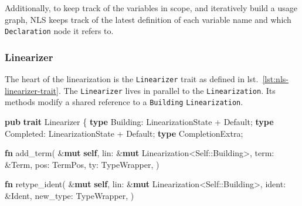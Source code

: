 \documentclass[
  a4paper,
  bibtex,
  english,
  nomenclature]{kthlatex/kththesis/kththesis}
\newenvironment{Shaded}{}{}
\newcommand{\DataTypeTok}[1]{\textcolor[rgb]{0.56,0.13,0.00}{#1}}
\newcommand{\KeywordTok}[1]{\textcolor[rgb]{0.00,0.44,0.13}{\textbf{#1}}}
\newcommand{\NormalTok}[1]{#1}
\newcommand{\OperatorTok}[1]{\textcolor[rgb]{0.40,0.40,0.40}{#1}}
\newcommand{\PreprocessorTok}[1]{\textcolor[rgb]{0.74,0.48,0.00}{#1}}
\begin{document}
Additionally, to keep track of the variables in scope, and iteratively
build a usage graph, NLS keeps track of the latest definition of each
variable name and which \texttt{Declaration} node it refers to.

\hypertarget{sec:linearizer}{%
\subsubsection{Linearizer}\label{sec:linearizer}}

The heart of the linearization is the \texttt{Linearizer} trait as
defined in lst.~\ref{lst:nls-linearizer-trait}. The \texttt{Linearizer}
lives in parallel to the \texttt{Linearization}. Its methods modify a
shared reference to a \texttt{Building} \texttt{Linearization}.

\begin{codelisting}

\caption{Interface of linearizer trait}

\hypertarget{lst:nls-linearizer-trait}{%
\label{lst:nls-linearizer-trait}}%
\begin{Shaded}
\begin{Highlighting}[]
\KeywordTok{pub} \KeywordTok{trait}\NormalTok{ Linearizer }\OperatorTok{\{}
    \KeywordTok{type}\NormalTok{ Building: LinearizationState + Default}\OperatorTok{;}
    \KeywordTok{type}\NormalTok{ Completed: LinearizationState + Default}\OperatorTok{;}
    \KeywordTok{type}\NormalTok{ CompletionExtra}\OperatorTok{;}

    \KeywordTok{fn}\NormalTok{ add\_term(}
        \OperatorTok{\&}\KeywordTok{mut} \KeywordTok{self}\OperatorTok{,}
\NormalTok{        lin}\OperatorTok{:} \OperatorTok{\&}\KeywordTok{mut}\NormalTok{ Linearization}\OperatorTok{\textless{}}\DataTypeTok{Self}\PreprocessorTok{::}\NormalTok{Building}\OperatorTok{\textgreater{},}
\NormalTok{        term}\OperatorTok{:} \OperatorTok{\&}\NormalTok{Term}\OperatorTok{,}
\NormalTok{        pos}\OperatorTok{:}\NormalTok{ TermPos}\OperatorTok{,}
\NormalTok{        ty}\OperatorTok{:}\NormalTok{ TypeWrapper}\OperatorTok{,}
\NormalTok{    )}

    \KeywordTok{fn}\NormalTok{ retype\_ident(}
        \OperatorTok{\&}\KeywordTok{mut} \KeywordTok{self}\OperatorTok{,}
\NormalTok{        lin}\OperatorTok{:} \OperatorTok{\&}\KeywordTok{mut}\NormalTok{ Linearization}\OperatorTok{\textless{}}\DataTypeTok{Self}\PreprocessorTok{::}\NormalTok{Building}\OperatorTok{\textgreater{},}
\NormalTok{        ident}\OperatorTok{:} \OperatorTok{\&}\NormalTok{Ident}\OperatorTok{,}
\NormalTok{        new\_type}\OperatorTok{:}\NormalTok{ TypeWrapper}\OperatorTok{,}
\NormalTok{    )}


\end{Highlighting}
\end{Shaded}
\end{codelisting}
\end{document}
